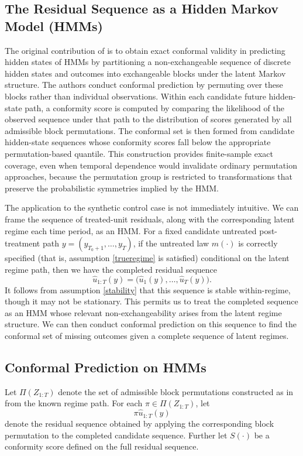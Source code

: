 \documentclass{article}
\begin{document}
\subsection{The Residual Sequence as a Hidden Markov Model (HMMs)}

The original contribution of \citet{Nettasinghe2023} is to obtain exact conformal validity in predicting hidden states of HMMs by partitioning a non-exchangeable sequence of discrete hidden states and outcomes into exchangeable blocks under the latent Markov structure. The authors conduct conformal prediction by permuting over these blocks rather than individual observations. Within each candidate future hidden-state path, a conformity score is computed by comparing the likelihood of the observed sequence under that path to the distribution of scores generated by all admissible block permutations. The conformal set is then formed from candidate hidden-state sequences whose conformity scores fall below the appropriate permutation-based quantile. This construction provides finite-sample exact coverage, even when temporal dependence would invalidate ordinary permutation approaches, because the permutation group is restricted to transformations that preserve the probabilistic symmetries implied by the HMM.

The application to the synthetic control case is not immediately intuitive. We can frame the sequence of treated-unit residuals, along with the corresponding latent regime each time period, as an HMM. For a fixed candidate untreated post-treatment path \(y=(y_{T_0+1},\dots,y_T)\), if the untreated law \(m(\cdot)\) is correctly specified (that is, assumption \ref{trueregime} is satisfied) conditional on the latent regime path, then we have the completed residual sequence
\[
\hat u_{1:T}(y)=\big(\hat u_1(y),\dots,\hat u_T(y)\big).
\]
It follows from assumption \ref{stability} that this sequence is stable within-regime, though it may not be stationary. This permits us to treat the completed sequence as an HMM whose relevant non-exchangeability arises from the latent regime structure. We can then conduct conformal prediction on this sequence to find the conformal set of missing outcomes given a complete sequence of latent regimes.

\subsection{Conformal Prediction on HMMs}

Let \(\Pi(Z_{1:T})\) denote the set of admissible block permutations constructed as in \citet{Nettasinghe2023} from the known regime path. For each \(\pi \in \Pi(Z_{1:T})\), let
\[
\pi \hat u_{1:T}(y)
\]
denote the residual sequence obtained by applying the corresponding block permutation to the completed candidate sequence. Further let \(S(\cdot)\) be a conformity score defined on the full residual sequence.
\end{document}
